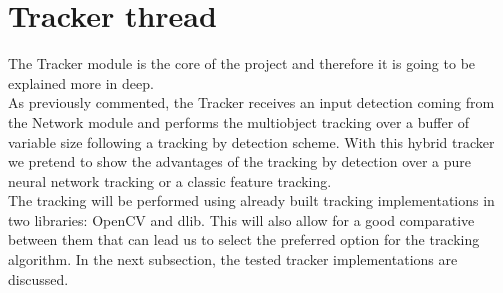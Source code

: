 \section{Tracker thread}
The Tracker module is the core of the project and therefore it is going to be explained more in deep.\\
As previously commented, the Tracker receives an input detection coming from the Network module and performs the multiobject tracking over a buffer of variable size following a tracking by detection scheme. With this hybrid tracker we pretend to show the advantages of the tracking by detection over a pure neural network tracking or a classic feature tracking.\\
The tracking will be performed using already built tracking implementations in two libraries: OpenCV and dlib. This will also allow for a good comparative between them that can lead us to select the preferred option for the tracking algorithm. In the next subsection, the tested tracker implementations are discussed.
